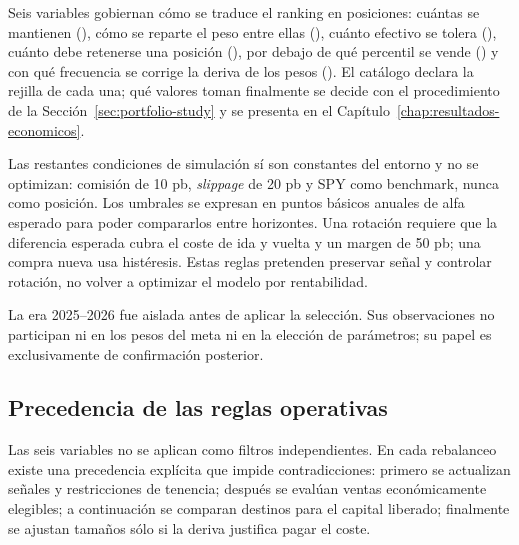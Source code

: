 Seis variables gobiernan cómo se traduce el ranking en posiciones: cuántas se mantienen
(), cómo se reparte el peso entre ellas (), cuánto
efectivo se tolera (), cuánto debe retenerse una posición
(), por debajo de qué percentil se vende
() y con qué frecuencia se corrige la deriva de los pesos
(). El catálogo declara la rejilla de cada una; qué valores
toman finalmente se decide con el procedimiento de la Sección~\ref{sec:portfolio-study} y se
presenta en el Capítulo~\ref{chap:resultados-economicos}.

Las restantes condiciones de simulación sí son constantes del entorno y no se optimizan: comisión de
10 pb, \textit{slippage} de 20 pb y SPY como benchmark, nunca como posición. Los umbrales se expresan
en puntos básicos anuales de alfa esperado para poder compararlos entre horizontes. Una rotación
requiere que la diferencia esperada cubra el coste de ida y vuelta y un margen de 50 pb; una compra
nueva usa histéresis. Estas reglas pretenden preservar señal y controlar rotación, no volver a
optimizar el modelo por rentabilidad.

La era 2025--2026 fue aislada antes de aplicar la selección. Sus observaciones no participan ni en
los pesos del meta ni en la elección de parámetros; su papel es exclusivamente de confirmación
posterior.

\subsection*{Precedencia de las reglas operativas}

Las seis variables no se aplican como filtros independientes. En cada rebalanceo existe una
precedencia explícita que impide contradicciones: primero se actualizan señales y restricciones de
tenencia; después se evalúan ventas económicamente elegibles; a continuación se comparan destinos
para el capital liberado; finalmente se ajustan tamaños sólo si la deriva justifica pagar el coste.

